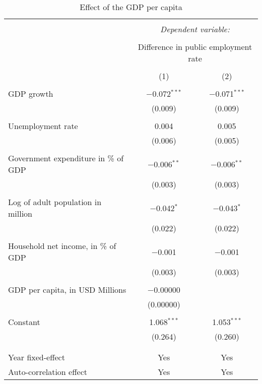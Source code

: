 
\begin{table}[!htbp] \centering 
  \caption{Effect of the GDP per capita} 
  \label{} 
\begin{tabular}{@{\extracolsep{5pt}}lcc} 
\\[-1.8ex]\hline 
\hline \\[-1.8ex] 
 & \multicolumn{2}{c}{\textit{Dependent variable:}} \\ 
\cline{2-3} 
\\[-1.8ex] & \multicolumn{2}{c}{Difference in public employment rate} \\ 
\\[-1.8ex] & (1) & (2)\\ 
\hline \\[-1.8ex] 
 GDP growth & $-$0.072$^{***}$ & $-$0.071$^{***}$ \\ 
  & (0.009) & (0.009) \\ 
  & & \\ 
 Unemployment rate & 0.004 & 0.005 \\ 
  & (0.006) & (0.005) \\ 
  & & \\ 
 Government expenditure in \% of GDP & $-$0.006$^{**}$ & $-$0.006$^{**}$ \\ 
  & (0.003) & (0.003) \\ 
  & & \\ 
 Log of adult population in million & $-$0.042$^{*}$ & $-$0.043$^{*}$ \\ 
  & (0.022) & (0.022) \\ 
  & & \\ 
 Household net income, in \% of GDP & $-$0.001 & $-$0.001 \\ 
  & (0.003) & (0.003) \\ 
  & & \\ 
 GDP per capita, in USD Millions & $-$0.00000 &  \\ 
  & (0.00000) &  \\ 
  & & \\ 
 Constant & 1.068$^{***}$ & 1.053$^{***}$ \\ 
  & (0.264) & (0.260) \\ 
  & & \\ 
\hline \\[-1.8ex] 
Year fixed-effect & Yes & Yes \\ 
Auto-correlation effect & Yes & Yes \\ 

\end{tabular}
\end{table}

